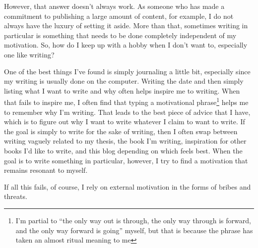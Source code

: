 \documentclass[12pt]{article}[titlepage]
\newcommand{\say}[1]{``#1''}
\newcommand{\1}{\={a}}
\newcommand{\2}{\={e}}
\newcommand{\3}{\={\i}}
\newcommand{\4}{\=o}
\newcommand{\5}{\=u}
\newcommand{\6}{\={A}}
\renewcommand{\,}{\textsuperscript{,}}
\begin{document}
However, that answer doesn't always work.
As someone who has made a commitment to publishing a large amount of content, for example, I do not always have the luxury of setting it aside.
More than that, sometimes writing in particular is something that needs to be done completely independent of my motivation.
So, how do I keep up with a hobby when I don't want to, especially one like writing?

One of the best things I've found is simply journaling a little bit, especially since my writing is usually done on the computer.
Writing the date and then simply listing what I want to write and why often helps inspire me to writing.
When that fails to inspire me, I often find that typing a motivational phrase\footnote{I'm partial to \say{the only way out is through, the only way through is forward, and the only way forward is going} myself, but that is because the phrase has taken an almost ritual meaning to me} helps me to remember why I'm writing.
That leads to the best piece of advice that I have, which is to figure out why I want to write whatever I claim to want to write.
If the goal is simply to write for the sake of writing, then I often swap between writing vaguely related to my thesis, the book I'm writing, inspiration for other books I'd like to write, and this blog depending on which feels best.
When the goal is to write something in particular, however, I try to find a motivation that remains resonant to myself.

If all this fails, of course, I rely on external motivation in the forms of bribes and threats.
\end{document}

